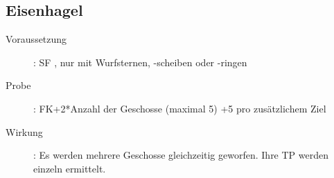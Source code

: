 \subsection{Eisenhagel}
\label{fernkampf.eisenhagel}
\begin{description}
    \item[Voraussetzung]:
        SF , nur mit Wurfsternen, -scheiben oder -ringen
    \item[Probe]:
        FK+2*Anzahl der Geschosse (maximal 5) +5 pro zusätzlichem Ziel
    \item[Wirkung]:
        Es werden mehrere Geschosse gleichzeitig geworfen. Ihre TP werden einzeln ermittelt.
\end{description}
